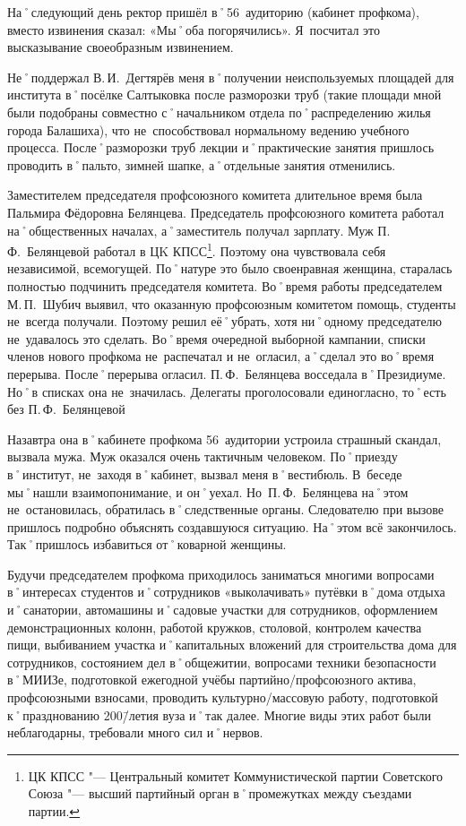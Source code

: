На˚следующий день ректор пришёл в˚56~аудиторию (кабинет профкома), вместо извинения сказал: «Мы˚оба погорячились». Я~посчитал это высказывание своеобразным извинением.

Не˚поддержал В.\,И.~Дегтярёв меня в˚получении неиспользуемых площадей для института в˚посёлке Салтыковка после разморозки труб (такие площади мной были подобраны совместно с˚начальником отдела по˚распределению жилья города Балашиха), что не~способствовал нормальному ведению учебного процесса. После˚разморозки труб лекции и˚практические занятия пришлось проводить в˚пальто, зимней шапке, а˚отдельные занятия отменились.

Заместителем председателя профсоюзного комитета длительное время была Пальмира Фёдоровна Белянцева. Председатель профсоюзного комитета работал на˚общественных началах, а˚заместитель получал зарплату. Муж П.\,Ф.~Белянцевой работал в ЦK КПСС\footnote{ЦК КПСС "--- Центральный комитет Коммунистической партии Советского Союза "--- высший партийный орган в˚промежутках между съездами партии.}. Поэтому она чувствовала себя независимой, всемогущей. По˚натуре это было своенравная женщина, старалась полностью подчинить председателя комитета. Во˚время работы председателем М.\,П.~Шубич выявил, что оказанную профсоюзным комитетом помощь, студенты не~всегда получали. Поэтому решил её˚убрать, хотя ни˚одному председателю не~удавалось это сделать. Во˚время очередной выборной кампании, списки членов нового профкома не~распечатал и не~огласил, а˚сделал это во˚время перерыва. После˚перерыва огласил. П.\,Ф.~Белянцева восседала в˚Президиуме. Но˚в списках она не~значилась. Делегаты проголосовали единогласно, то˚есть без П.\,Ф.~Белянцевой 

Назавтра она в˚кабинете профкома 56~аудитории устроила страшный скандал, вызвала мужа. Муж оказался очень тактичным человеком. По˚приезду в˚институт, не~заходя в˚кабинет, вызвал меня в˚вестибюль. В~беседе мы˚нашли взаимопонимание, и он˚уехал. Но~П.\,Ф.~Белянцева на˚этом не~остановилась, обратилась в˚следственные органы. Следователю при вызове пришлось подробно объяснять создавшуюся ситуацию. На˚этом всё закончилось. Так˚пришлось избавиться от˚коварной женщины. 

Будучи председателем профкома приходилось заниматься многими вопросами в˚интересах студентов и˚сотрудников «выколачивать» путёвки в˚дома отдыха и˚санатории, автомашины и˚садовые участки для сотрудников, оформлением демонстрационных колонн, работой кружков, столовой, контролем качества пищи, выбиванием участка и˚капитальных вложений для строительства дома для сотрудников, состоянием дел в˚общежитии, вопросами техники безопасности в˚МИИЗе, подготовкой ежегодной учёбы партийно\-/профсоюзного актива, профсоюзными взносами, проводить культурно\-/массовую работу, подготовкой к˚празднованию 200\=/летия вуза и˚так далее. Многие виды этих работ были неблагодарны, требовали много сил и˚нервов. 

